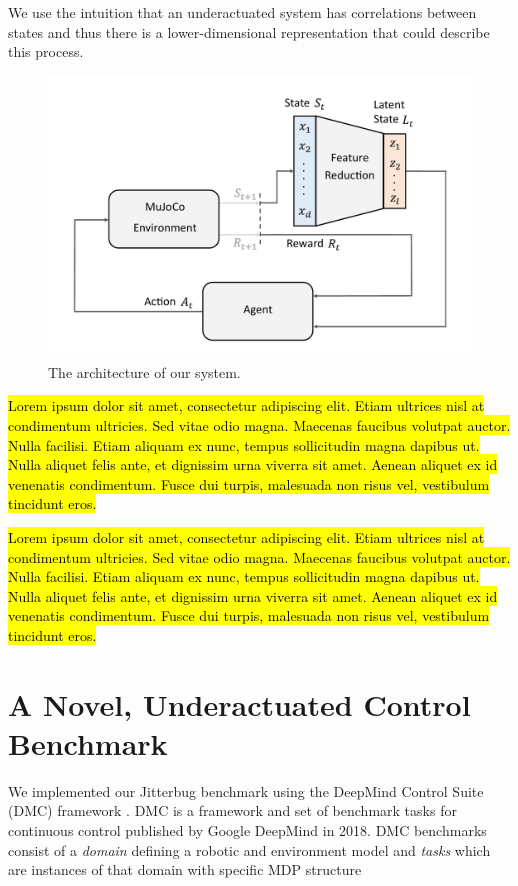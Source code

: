 \documentclass[letterpaper, 10 pt, conference]{ieeeconf}
\begin{document}
We use the intuition that an underactuated system has correlations between states %
and thus there is a lower-dimensional representation that could describe this process. 

\begin{figure}[t]
    \centering
    \includegraphics[width=\linewidth]{fig-system-arch}
    \caption{
        The architecture of our system.
    }
    \label{fig:system-arch}
\end{figure}


\hl{Lorem ipsum dolor sit amet, consectetur adipiscing elit. Etiam ultrices nisl at condimentum ultricies. Sed vitae odio magna. Maecenas faucibus volutpat auctor. Nulla facilisi. Etiam aliquam ex nunc, tempus sollicitudin magna dapibus ut. Nulla aliquet felis ante, et dignissim urna viverra sit amet. Aenean aliquet ex id venenatis condimentum. Fusce dui turpis, malesuada non risus vel, vestibulum tincidunt eros.}

\hl{Lorem ipsum dolor sit amet, consectetur adipiscing elit. Etiam ultrices nisl at condimentum ultricies. Sed vitae odio magna. Maecenas faucibus volutpat auctor. Nulla facilisi. Etiam aliquam ex nunc, tempus sollicitudin magna dapibus ut. Nulla aliquet felis ante, et dignissim urna viverra sit amet. Aenean aliquet ex id venenatis condimentum. Fusce dui turpis, malesuada non risus vel, vestibulum tincidunt eros.}


\section{A Novel, Underactuated Control Benchmark}
We implemented our Jitterbug benchmark using the DeepMind Control Suite (DMC) framework \cite{Tassa2018DMC}.
DMC is a framework and set of benchmark tasks for continuous control published by Google DeepMind in 2018.
DMC benchmarks consist of a \emph{domain} defining a robotic and environment model and \emph{tasks} which are instances of that domain with specific MDP structure
\end{document}
